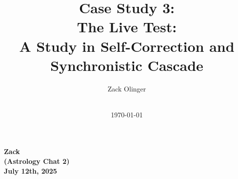 \documentclass{article}
\newcommand{\docTitle}{Case Study 3: \\The Live Test: \\A Study in Self-Correction and Synchronistic Cascade}
\newcommand{\docAuthor}{Zack Olinger}
\newcommand{\docVersion}{\csLiveTestVersion}
\begin{document}
\pagestyle{plain}

\begin{titlepage}
    \title{\docTitle}
    \author{\docAuthor}
    \date{
        \docVersion \\
        \vspace{1em}
        \today
    }
    \maketitle
    \thispagestyle{empty}

    \begin{abstract}
        \csLiveTestAbstract
    \end{abstract}

\end{titlepage}

\licensepage

\tableofcontents
\label{LastFrontMatterPage}
\cleardoublepage
{}

\pagestyle{mainbody}


\begin{center}
\textbf{Zack} \\
\textbf{(Astrology Chat 2)} \\
\textbf{July 12th, 2025}
\end{center}
\end{document}
